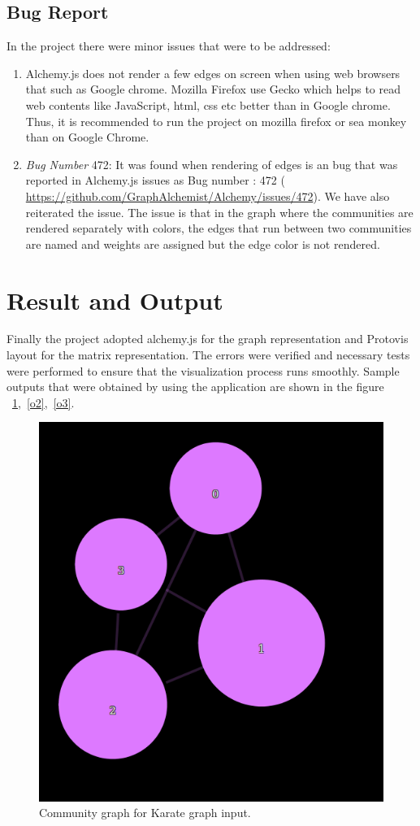 \subsection{Bug Report}
In the project there were minor issues that were to be addressed:
\begin{enumerate}
\item  Alchemy.js does not render a few
edges on screen when using web browsers that such as Google chrome. Mozilla Firefox use Gecko
which helps to read web contents like JavaScript, html, css etc better than in Google chrome. Thus,
it is recommended to run the project on mozilla firefox or sea monkey than on Google Chrome.
\item \textit{Bug Number} 472: It was found when rendering of edges is an bug that was reported in Alchemy.js issues as Bug number : 472 ( \url{https://github.com/GraphAlchemist/Alchemy/issues/472}). We have also reiterated the issue. The issue is that in the graph where the communities are rendered separately with colors, the edges that run between two communities are named and weights are assigned but the edge color is not rendered.
\end{enumerate}

\section{Result and Output}
Finally the project adopted alchemy.js for the graph representation and Protovis layout for the matrix representation.  The errors were verified and necessary tests were performed to ensure that the visualization process runs smoothly. Sample outputs that were obtained by using the application are shown in the figure ~\ref{o1},~\ref{o2},~\ref{o3}.
\begin{figure}[H]
\centering
\includegraphics[scale=0.3]{o1.png}
\caption{\label{o1}Community graph for Karate graph input.}
\end{figure}

